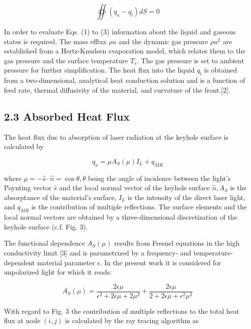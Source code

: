 \documentclass[10pt]{article}
\begin{document}
\begin{equation*}
\oiint\left(q_{a}-q_{l}\right) d S=0 \tag{3}
\end{equation*}


In order to evaluate Eqs. (1) to (3) information about the liquid and gaseous states is required. The mass efflux $\rho u$ and the dynamic gas pressure $\rho u^{2}$ are established from a Hertz-Knudsen evaporation model, which relates them to the gas pressure and the surface temperature $T_{s}$. The gas pressure is set to ambient pressure for further simplification. The heat flux into the liquid $q_{l}$ is obtained from a two-dimensional, analytical heat conduction solution and is a function of feed rate, thermal diffusivity of the material, and curvature of the front.[2].

\subsection*{2.3 Absorbed Heat Flux}
The heat flux due to absorption of laser radiation at the keyhole surface is calculated by


\begin{equation*}
q_{a}=\mu A_{S}(\mu) I_{L}+q_{M R} \tag{4}
\end{equation*}


where $\mu=-\hat{s} \cdot \hat{n}=\cos \theta, \theta$ being the angle of incidence between the light's Poynting vector $\hat{s}$ and the local normal vector of the keyhole surface $\hat{n}, A_{S}$ is the absorptance of the material's surface, $I_{L}$ is the intensity of the direct laser light, and $q_{M R}$ is the contribution of multiple reflections. The surface elements and the local normal vectors are obtained by a three-dimensional discretization of the keyhole surface (c.f. Fig. 3).

The functional dependence $A_{S}(\mu)$ results from Fresnel equations in the high conductivity limit [3] and is parametrized by a frequency- and temperature-dependent material parameter $\epsilon$. In the present work it is considered for unpolarized light for which it reads:


\begin{equation*}
A_{S}(\mu)=\frac{2 \epsilon \mu}{\epsilon^{2}+2 \epsilon \mu+2 \mu^{2}}+\frac{2 \epsilon \mu}{2+2 \epsilon \mu+\epsilon^{2} \mu^{2}} \tag{5}
\end{equation*}


With regard to Fig. 3 the contribution of multiple reflections to the total heat flux at node $(i, j)$ is calculated by the ray tracing algorithm as
\end{document}
